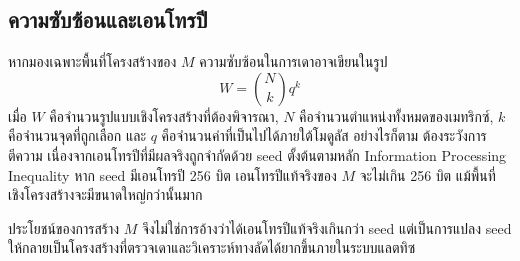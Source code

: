 \documentclass[14pt,a4paper]{extarticle}
\newcommand{\eng}[1]{\textenglish{#1}}
\begin{document}
\subsection{ความซับซ้อนและเอนโทรปี}
หากมองเฉพาะพื้นที่โครงสร้างของ $M$ ความซับซ้อนในการเดาอาจเขียนในรูป
\[
    W = \binom{N}{k}q^k
\]
เมื่อ $W$ คือจำนวนรูปแบบเชิงโครงสร้างที่ต้องพิจารณา, $N$ คือจำนวนตำแหน่งทั้งหมดของเมทริกซ์, $k$ คือจำนวนจุดที่ถูกเลือก และ $q$ คือจำนวนค่าที่เป็นไปได้ภายใต้โมดูลัส อย่างไรก็ตาม ต้องระวังการตีความ เนื่องจากเอนโทรปีที่มีผลจริงถูกจำกัดด้วย seed ตั้งต้นตามหลัก \eng{Information Processing Inequality} หาก seed มีเอนโทรปี 256 บิต เอนโทรปีแท้จริงของ $M$ จะไม่เกิน 256 บิต แม้พื้นที่เชิงโครงสร้างจะมีขนาดใหญ่กว่านั้นมาก

ประโยชน์ของการสร้าง $M$ จึงไม่ใช่การอ้างว่าได้เอนโทรปีแท้จริงเกินกว่า seed แต่เป็นการแปลง seed ให้กลายเป็นโครงสร้างที่ตรวจเดาและวิเคราะห์ทางลัดได้ยากขึ้นภายในระบบแลตทิซ
\end{document}
